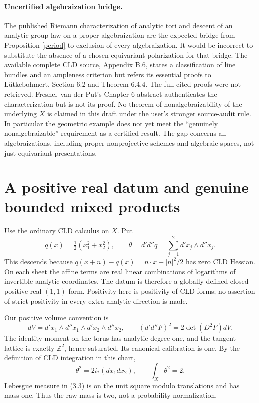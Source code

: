 \documentclass[11pt]{article}
\theoremstyle{definition}\newtheorem{definition}[theorem]{Definition}
\newcommand{\dd}{d'd''}
\newcommand{\Z}{\mathbb Z}
\begin{document}
\paragraph{Uncertified algebraization bridge.}
The published Riemann characterization of analytic tori and descent of an
analytic group law on a proper algebraization are the expected bridge from
Proposition \ref{period} to exclusion of every algebraization. It would be
incorrect to substitute the absence of a chosen equivariant polarization for
that bridge. The available complete CLD source, Appendix B.6, states a
classification of line bundles and an ampleness criterion but refers its
essential proofs to L\"utkebohmert, Section 6.2 and Theorem 6.4.4.
The full cited proofs were not retrieved. Fresnel--van der Put's Chapter 6
abstract authenticates the characterization but is not its proof. No theorem
of nonalgebraizability of the underlying $X$ is claimed in this draft under
the user's stronger source-audit rule. In particular the geometric example
does not yet meet the ``genuinely nonalgebraizable'' requirement as a certified
result. The gap concerns all algebraizations, including proper nonprojective
schemes and algebraic spaces, not just equivariant presentations.

\section{A positive real datum and genuine bounded mixed products}
Use the ordinary CLD calculus on $X$. Put
\[
 q(x)=\tfrac12(x_1^2+x_2^2),\qquad
 \theta=\dd q=\sum_{j=1}^2 d'x_j\wedge d''x_j.             \tag{3.1}
\]
This descends because $q(x+n)-q(x)=n\cdot x+|n|^2/2$ has zero CLD Hessian.
On each sheet the affine terms are real linear combinations of logarithms
of invertible analytic coordinates. The datum is therefore a globally
defined closed positive real $(1,1)$-form. Positivity here is positivity of
CLD forms; no assertion of strict positivity in every extra analytic direction
is made.

Our positive volume convention is
\[
 dV=d'x_1\wedge d''x_1\wedge d'x_2\wedge d''x_2,
 \qquad (\dd F)^2=2\det(D^2F)dV.                         \tag{3.2}
\]
The identity moment on the torus has analytic degree one, and the tangent
lattice is exactly $\Z^2$, hence saturated. Its canonical calibration is
one. By the definition of CLD integration in this chart,
\[
 \theta^2=2i_*(dx_1dx_2),\qquad \int_X\theta^2=2.          \tag{3.3}
\]
Lebesgue measure in (3.3) is on the unit square modulo translations and has
mass one. Thus the raw mass is two, not a probability normalization.
\end{document}
